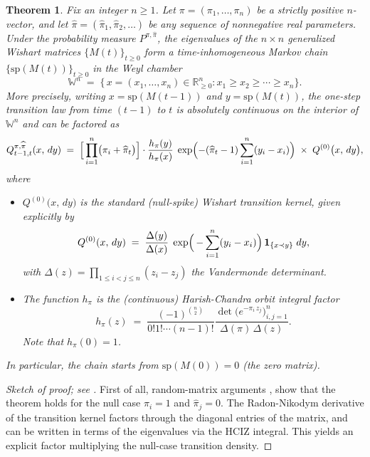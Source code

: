 \documentclass[letterpaper,11pt,oneside,reqno]{book}
\numberwithin{equation}{chapter}  %
\newtheorem{theorem}[proposition]{Theorem}
\theoremstyle{definition}
\begin{document}
\begin{theorem}
\label{lecture13:thm:MarkovChain}
Fix an integer \(n\ge1\).  Let \(\pi=(\pi_1,\dots,\pi_n)\) be a strictly positive \(n\)-vector, and let \(\widehat\pi=(\widehat\pi_1,\widehat\pi_2,\dots)\) be any sequence of nonnegative real parameters.  Under the probability measure \(P^{\pi,\widehat\pi}\), the eigenvalues of the \(n\times n\) generalized Wishart matrices \(\{M(t)\}_{t\ge0}\) form a time-inhomogeneous Markov chain \(\{\mathrm{sp}(M(t))\}_{t\ge0}\) in the Weyl chamber
\[
\mathbb{W}^n
\;=\;
\bigl\{\,x=(x_1,\dots,x_n)\in\mathbb{R}^n_{\ge0}:
x_1\ge x_2\ge\cdots\ge x_n\bigr\}.
\]
More precisely, writing \(x=\mathrm{sp}(M(t-1))\) and \(y=\mathrm{sp}(M(t))\), the one-step transition law from time \((t-1)\) to \(t\) is absolutely continuous on the interior of \(\mathbb{W}^n\) and can be factored as
\begin{equation}
\label{lecture13:eq:transition-density}
Q_{t-1,t}^{\pi,\widehat\pi}(x,\,dy)
\;=\;
\Bigl[\,
\prod_{i=1}^n \bigl(\pi_i+\widehat\pi_{t}\bigr)
\Bigr]
\cdot
\frac{h_{\pi}(y)}{h_{\pi}(x)}
\;\exp\Bigl(-(\widehat\pi_{t}-1)\sum_{i=1}^n (y_i - x_i)\Bigr)
\;\times\;Q^{(0)}\bigl(x,\,dy\bigr),
\end{equation}
where
\begin{itemize}
\item \(\displaystyle Q^{(0)}\bigl(x,\,dy\bigr)\) is the \emph{standard} (null-spike) Wishart transition kernel, given explicitly by
	\begin{equation}
		\label{lecture13:eq:Q0}
Q^{(0)}(x,\,dy)
\;=\;
\frac{\Delta(y)}{\Delta(x)}\;\exp\Bigl(\,-\sum_{i=1}^n (y_i - x_i)\Bigr)\,
\mathbf{1}_{\{x\prec y\}}\;dy,
\end{equation}
with \(\Delta(z)=\prod_{1\le i<j\le n}(z_i - z_j)\) the Vandermonde determinant.

\item The function \(h_{\pi}\) is the (continuous) Harish-Chandra orbit integral factor
\[
h_{\pi}(z)
\;=\;
\frac{(-1)^{\binom n2}}{0! 1! \cdots (n-1)! }
\frac{\det\bigl(e^{-\pi_i\,z_j}\bigr)_{i,j=1}^n}{\Delta(\pi)\,\Delta(z)}.
\]
Note that $h_\pi(0)=1$.
\end{itemize}
In particular, the chain starts from \(\mathrm{sp}(M(0))=0\) (the zero matrix).
\end{theorem}

\begin{proof}[Sketch of proof; see \cite{dieker2008largest}]
	First of all, random-matrix arguments
	\cite{defosseux2010orbit}, \cite{forrester2006jacobians} show that the
	theorem holds for the null case $\pi_i=1$ and $\hat\pi_j=0$.
	The Radon-Nikodym derivative of the transition kernel
	factors through the diagonal entries of the matrix,
	and can be written in terms of the eigenvalues via
	the HCIZ integral.
	This yields an explicit factor multiplying the null-case
	transition density.
\end{proof}
\end{document}

